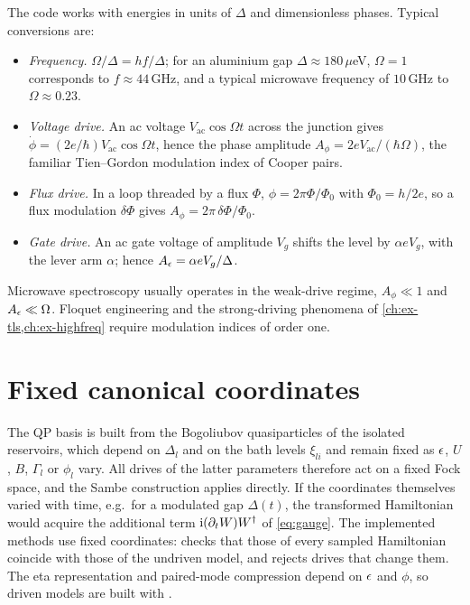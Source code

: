 The code works with energies in units of $\Delta$ and dimensionless phases. Typical
conversions are:
\begin{itemize}
\item \emph{Frequency.} $\Omega/\Delta=hf/\Delta$; for an aluminium gap $\Delta\approx
180\,\mu$eV, $\Omega=1$ corresponds to $f\approx44$\,GHz, and a typical microwave frequency
of $10$\,GHz to $\Omega\approx0.23$.
\item \emph{Voltage drive.} An ac voltage $V_{\mathrm{ac}}\cos\Omega t$ across the junction
gives $\dot\phi=(2e/\hbar)V_{\mathrm{ac}}\cos\Omega t$, hence the phase amplitude
$A_\phi=2eV_{\mathrm{ac}}/(\hbar\Omega)$, the familiar Tien--Gordon modulation index of Cooper
pairs.
\item \emph{Flux drive.} In a loop threaded by a flux $\Phi$, $\phi=2\pi\Phi/\Phi_0$ with
$\Phi_0=h/2e$, so a flux modulation $\delta\Phi$ gives $A_\phi=2\pi\,\delta\Phi/\Phi_0$.
\item \emph{Gate drive.} An ac gate voltage of amplitude $V_g$ shifts the level by
$\alpha eV_g$, with the lever arm $\alpha$; hence $A_\epsilon=\alpha eV_g/\Delta$.
\end{itemize}
Microwave spectroscopy usually operates in the weak-drive regime, $A_\phi\ll1$ and
$A_\epsilon\ll\Omega$. Floquet engineering and the strong-driving phenomena of
\cref{ch:ex-tls,ch:ex-highfreq} require modulation indices of order one.

\section{Fixed canonical coordinates}\label{sec:fixed-coordinates}

The QP basis is built from the Bogoliubov quasiparticles of the isolated reservoirs, which
depend on $\Delta_l$ and on the bath levels $\xi_{li}$ and remain fixed as $\epsilon$, $U$, $B$,
$\Gamma_l$ or $\phi_l$ vary. All drives of the latter parameters therefore act on a fixed Fock
space, and the Sambe construction applies directly. If the coordinates themselves varied
with time, e.g.\ for a modulated gap $\Delta(t)$, the transformed Hamiltonian would acquire
the additional term $\mathrm{i}(\partial_tW)W^\dagger$ of \cref{eq:gauge}. The implemented methods
use fixed coordinates: \pkg{} checks that those of every sampled Hamiltonian
coincide with those of the undriven model, and rejects drives that change them. The eta
representation and paired-mode compression depend on $\epsilon$ and $\phi$, so driven models
are built with .

